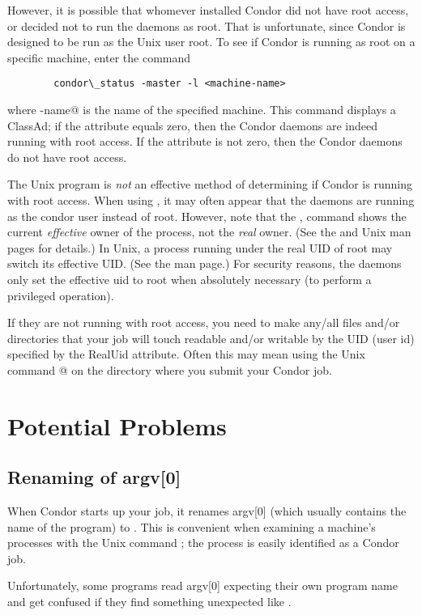 However, it is possible that whomever installed Condor 
did not have root access, or
decided not to run the daemons as root.
That is unfortunate,
since Condor is designed to be run as the Unix user root.
To see if Condor is
running as root on a specific machine, enter the command
\begin{verbatim}
        condor\_status -master -l <machine-name>
\end{verbatim}

where \verb@machine-name@ is the name of the specified machine.
This command displays a  ClassAd; if the
attribute  equals zero,
then the Condor daemons are indeed
running with root access.  If the
 attribute is not zero, then the Condor daemons do not have
root access.

\Note The Unix program 
is \emph{not} an effective
method of determining if Condor is running with root access.
When using ,
it may often appear that the daemons are
running as the condor user instead of root.
However, note that the ,
command shows the current \emph{effective} owner of the
process, not the \emph{real} owner.  (See the  and
 Unix man pages for details.)  In Unix, a process
running under the real UID of root may switch its effective UID.
(See the  man page.)
For security reasons, the daemons
only set the effective uid to root when absolutely necessary
(to perform a privileged operation).

If they are not running with root access, you need to make any/all files
and/or directories that your job will touch readable and/or writable by
the UID (user id) specified by the RealUid attribute.
Often this may
mean using the Unix command @
on the directory where you submit your Condor job.

\section{Potential Problems}

\subsection{Renaming of argv[0]}

When Condor starts up your job, it renames argv[0] (which usually
contains the name of the program) to .
This is
convenient when examining a machine's processes with the Unix
command ; the process
is easily identified as a Condor job.  

Unfortunately, some programs read argv[0] expecting their own program
name and get confused if they find something unexpected like
.

